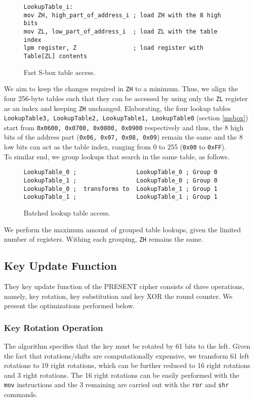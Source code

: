 \documentclass{llncs}
\begin{document}
\begin{figure}
\begin{lstlisting}
LookupTable_i:
mov ZH, high_part_of_address_i ; load ZH with the 8 high bits
mov ZL, low_part_of_address_i  ; load ZL with the table index
lpm register, Z                ; load register with Table[ZL] contents
\end{lstlisting}
	\caption{Fast S-box table access.}
\label{sbox_squared}
\end{figure}
We aim to keep the changes required in \texttt{ZH} to a minimum. Thus, we align the four 256-byte tables such that they can be accessed by using only the  \texttt{ZL} register as an index and keeping \texttt{ZH} unchanged. Elaborating, the four lookup tables \texttt{LookupTable3, LookupTable2, LookupTable1, LookupTable0} (section \ref{msbox}) start from \texttt{0x0600, 0x0700, 0x0800, 0x0900} respectively and thus, the 8 high bits of the address part (\texttt{0x06, 0x07, 0x08, 0x09}) remain the same and the 8 low bits can act as the table index, ranging from 0 to 255 (\texttt{0x00} to \texttt{0xFF}). \\
To similar end, we group lookups that search in the same table, as follows.
\begin{figure}
\begin{lstlisting}
LookupTable_0 ;	                LookupTable_0 ; Group 0 
LookupTable_1 ;	                LookupTable_0 ; Group 0
LookupTable_0 ;  transforms to  LookupTable_1 ; Group 1
LookupTable_1 ;	                LookupTable_1 ; Group 1
\end{lstlisting}
	\caption{Batched lookup table access.}
\label{batched_lookup}
\end{figure}
We perform the maximum amount of grouped table lookups, given the limited number of registers. Withing each grouping, \texttt{ZH} remains the same.
\subsection{Key Update Function}
They key update function of the PRESENT cipher consists of three operations, namely, key rotation, key substitution and key XOR the round counter. We present the optimizations performed below.
\subsubsection{Key Rotation Operation}
The algorithm specifies that the key must be rotated by 61 bits to the left. Given the fact that rotations/shifts are computationally expensive, we transform 61 left rotations to 19 right rotations, which can be further reduced to 16 right rotations and 3 right rotations. The 16 right rotations can be easily performed with the \texttt{mov} instructions and the 3 remaining are carried out with the \texttt{ror} and \texttt{shr} commands.
\end{document}
